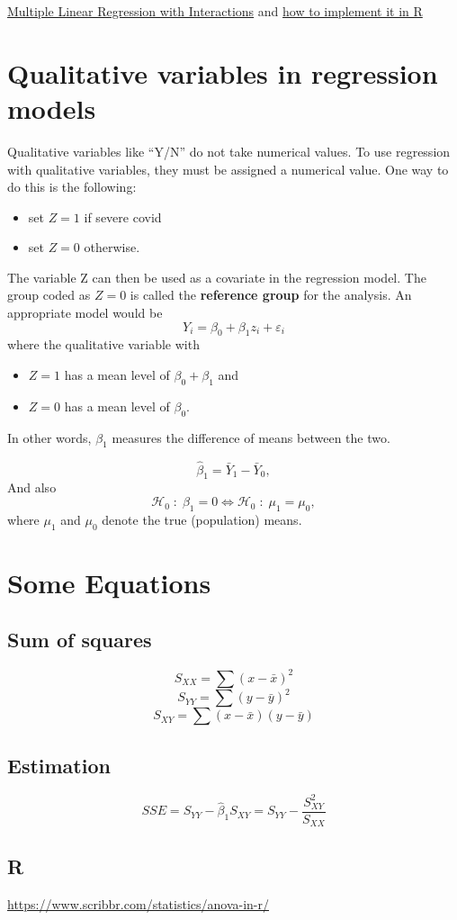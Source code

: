 \documentclass[12pt]{article}
\theoremstyle{definition}
\theoremstyle{remark}
\begin{document}
\href{https://www.jmp.com/en_ca/statistics-knowledge-portal/what-is-multiple-regression/mlr-with-interactions.html}{Multiple Linear Regression with Interactions} and 
\href{http://www.sthda.com/english/articles/40-regression-analysis/164-interaction-effect-in-multiple-regression-essentials/}{how to implement it in R}

\section{Qualitative variables in regression models}
Qualitative variables like “Y/N” do not take numerical values.
To use regression with qualitative variables, they must be assigned a numerical value.
One way to do this is the following:
\begin{itemize}
    \item set $Z = 1$ if severe covid
    \item set $Z = 0$ otherwise.
\end{itemize}
The variable Z can then be used as a covariate in the regression model. 
The group coded as $Z = 0$ is called the \textbf{reference group} for the analysis.
An appropriate model would be 
$$Y_i = \beta_0 + \beta_1 z_i +\varepsilon_i$$
where the qualitative variable with 
\begin{itemize}
    \item $Z=1$ has a mean level of $\beta_0 + \beta_1$ and
    \item $Z=0$ has a mean level of $\beta_0$.
\end{itemize}
In other words, $\beta_1$ measures the difference of means between the two.

$$\hat{\beta}_1=\bar{Y}_1 - \bar{Y}_0,$$ 
And also $$\mathcal{H}_0\;:\;\beta_1=0 \iff \mathcal{H}_0\;:\; \mu_1=\mu_0,$$
 where $\mu_1$ and $\mu_0$ denote the true (population) means.
\newpage
\appendix 
\section{Some Equations}
\subsection*{Sum of squares}
\begin{equation*}
    S_{XX} = \sum (x- \bar{x})^2
\end{equation*}
\begin{equation*}
    S_{YY} = \sum (y- \bar{y})^2 
\end{equation*}
\begin{equation*}
    S_{XY} = \sum (x- \bar{x})(y - \bar{y})
\end{equation*}
\subsection*{Estimation}
$$SSE =S_{YY}-\hat{\beta}_1 S_{XY} = S_{YY} - \frac{S^2_{XY}}{S_{XX}} $$
\subsection*{R}
\href{https://www.scribbr.com/statistics/anova-in-r/}{https://www.scribbr.com/statistics/anova-in-r/}
\end{document}
